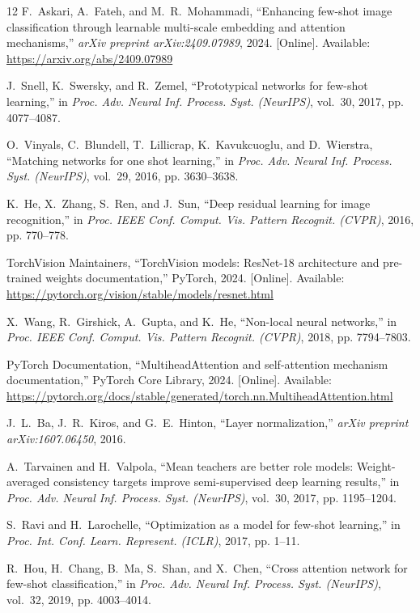 \documentclass[conference]{IEEEtran}
\begin{document}
\begin{thebibliography}{12}
F.~Askari, A.~Fateh, and M.~R.~Mohammadi, ``Enhancing few-shot image classification through learnable multi-scale embedding and attention mechanisms,'' \emph{arXiv preprint arXiv:2409.07989}, 2024. [Online]. Available: \url{https://arxiv.org/abs/2409.07989}

J.~Snell, K.~Swersky, and R.~Zemel, ``Prototypical networks for few-shot learning,'' in \emph{Proc. Adv. Neural Inf. Process. Syst. (NeurIPS)}, vol.~30, 2017, pp. 4077--4087.

O.~Vinyals, C.~Blundell, T.~Lillicrap, K.~Kavukcuoglu, and D.~Wierstra, ``Matching networks for one shot learning,'' in \emph{Proc. Adv. Neural Inf. Process. Syst. (NeurIPS)}, vol.~29, 2016, pp. 3630--3638.

K.~He, X.~Zhang, S.~Ren, and J.~Sun, ``Deep residual learning for image recognition,'' in \emph{Proc. IEEE Conf. Comput. Vis. Pattern Recognit. (CVPR)}, 2016, pp. 770--778.

TorchVision Maintainers, ``TorchVision models: ResNet-18 architecture and pre-trained weights documentation,'' PyTorch, 2024. [Online]. Available: \url{https://pytorch.org/vision/stable/models/resnet.html}

X.~Wang, R.~Girshick, A.~Gupta, and K.~He, ``Non-local neural networks,'' in \emph{Proc. IEEE Conf. Comput. Vis. Pattern Recognit. (CVPR)}, 2018, pp. 7794--7803.

PyTorch Documentation, ``MultiheadAttention and self-attention mechanism documentation,'' PyTorch Core Library, 2024. [Online]. Available: \url{https://pytorch.org/docs/stable/generated/torch.nn.MultiheadAttention.html}

J.~L.~Ba, J.~R.~Kiros, and G.~E.~Hinton, ``Layer normalization,'' \emph{arXiv preprint arXiv:1607.06450}, 2016.

A.~Tarvainen and H.~Valpola, ``Mean teachers are better role models: Weight-averaged consistency targets improve semi-supervised deep learning results,'' in \emph{Proc. Adv. Neural Inf. Process. Syst. (NeurIPS)}, vol.~30, 2017, pp. 1195--1204.

S.~Ravi and H.~Larochelle, ``Optimization as a model for few-shot learning,'' in \emph{Proc. Int. Conf. Learn. Represent. (ICLR)}, 2017, pp. 1--11.

R.~Hou, H.~Chang, B.~Ma, S.~Shan, and X.~Chen, ``Cross attention network for few-shot classification,'' in \emph{Proc. Adv. Neural Inf. Process. Syst. (NeurIPS)}, vol.~32, 2019, pp. 4003--4014.

\end{thebibliography}
\end{document}
